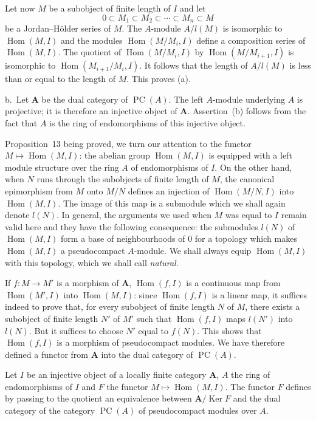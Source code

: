 Let now $M$ be a subobject of finite length of $I$ and let
\[
0\subset M_1\subset M_2\subset\cdots\subset M_n\subset M
\]
be a Jordan--Hölder series of $M$. The $A$-module $A/l(M)$ is
isomorphic to $\operatorname{Hom}(M,I)$ and the modules
$\operatorname{Hom}(M/M_i,I)$ define a composition series of
$\operatorname{Hom}(M,I)$. The quotient of $\operatorname{Hom}(M/M_i,I)$
by $\operatorname{Hom}(M/M_{i+1},I)$ is isomorphic to
$\operatorname{Hom}(M_{i+1}/M_i,I)$. It follows that the length of
$A/l(M)$ is less than or equal to the length of $M$. This proves (a).

b.\ Let $\mathbf{A}$ be the dual category of $\operatorname{PC}(A)$.
The left $A$-module underlying $A$ is projective; it is therefore an
injective object of $\mathbf{A}$. Assertion~(b) follows from the fact
that $A$ is the ring of endomorphisms of this injective object.

Proposition~13 being proved, we turn our attention to the functor
$M\mapsto\operatorname{Hom}(M,I)$: the abelian group
$\operatorname{Hom}(M,I)$ is equipped with a left module structure over
the ring $A$ of endomorphisms of $I$. On the other hand, when $N$ runs
through the subobjects of finite length of $M$, the canonical
epimorphism from $M$ onto $M/N$ defines an injection of
$\operatorname{Hom}(M/N,I)$ into $\operatorname{Hom}(M,I)$. The image of
this map is a submodule which we shall again denote $l(N)$. In
general, the arguments we used when $M$ was equal to $I$ remain valid
here and they have the following consequence: the submodules $l(N)$ of
$\operatorname{Hom}(M,I)$ form a base of neighbourhoods of $0$ for a
topology which makes $\operatorname{Hom}(M,I)$ a pseudocompact
$A$-module. We shall always equip $\operatorname{Hom}(M,I)$ with this
topology, which we shall call \emph{natural}.

If $f\colon M\to M'$ is a morphism of $\mathbf{A}$,
$\operatorname{Hom}(f,I)$ is a continuous map from
$\operatorname{Hom}(M',I)$ into $\operatorname{Hom}(M,I)$: since
$\operatorname{Hom}(f,I)$ is a linear map, it suffices indeed to prove
that, for every subobject of finite length $N$ of $M$, there exists a
subobject of finite length $N'$ of $M'$ such that
$\operatorname{Hom}(f,I)$ maps $l(N')$ into $l(N)$. But it suffices to
choose $N'$ equal to $f(N)$. This shows that $\operatorname{Hom}(f,I)$
is a morphism of pseudocompact modules. We have therefore defined a
functor from $\mathbf{A}$ into the dual category of
$\operatorname{PC}(A)$.

\begin{theorem}
Let $I$ be an injective object of a locally finite category
$\mathbf{A}$, $A$ the ring of endomorphisms of $I$ and $F$ the functor
$M\mapsto\operatorname{Hom}(M,I)$. The functor $F$ defines by passing
to the quotient an equivalence between
$\mathbf{A}/\operatorname{Ker}F$ and the dual category of the category
$\operatorname{PC}(A)$ of pseudocompact modules over $A$.
\end{theorem}

